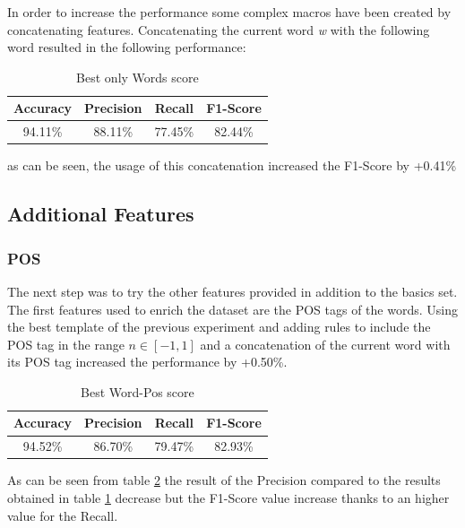 \documentclass[11pt,a4paper]{article}
\begin{document}
In order to increase the performance some complex macros have been created by concatenating features. Concatenating the current word \textit{w} with the following word resulted in the following performance:
\begin{table}[H]
    \begin{center}
        \begin{tabular}{|c|c|c|c|}
            \hline \bf Accuracy &   \bf Precision &  \bf Recall &  \bf F1-Score   \\ \hline
            94.11\% & 88.11\% & 77.45\% & 82.44\%\\
            \hline
        \end{tabular}
    \end{center}
    \caption{\label{t4} Best only Words score}
\end{table}

as can be seen, the usage of this concatenation increased the F1-Score by +0.41\%

\subsection{Additional Features}
\subsubsection{POS}
The next step was to try the other features provided in addition to the basics set. The first features used to enrich the dataset are the POS tags of the words. Using the best template of the previous experiment and adding rules to include the POS tag in the range $n \in [-1,1]$ and a concatenation of the current word with its POS tag increased the performance by +0.50\%.
\begin{table}[H]
    \begin{center}
        \begin{tabular}{|c|c|c|c|}
            \hline \bf Accuracy &   \bf Precision &  \bf Recall &  \bf F1-Score   \\ \hline
            94.52\% & 86.70\% & 79.47\% & 82.93\%\\
            \hline
        \end{tabular}
    \end{center}
    \caption{\label{t5} Best Word-Pos score}
\end{table}
As can be seen from table \ref{t5} the result of the Precision compared to the results obtained in table \ref{t4} decrease but the F1-Score value increase thanks to an higher value for the Recall.
\end{document}
